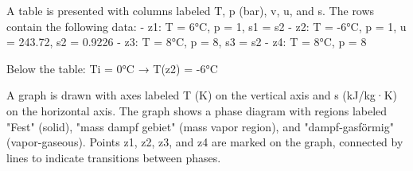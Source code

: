 A table is presented with columns labeled T, p (bar), v, u, and s. The rows contain the following data:  
- z1: T = 6°C, p = 1, s1 = s2  
- z2: T = -6°C, p = 1, u = 243.72, s2 = 0.9226  
- z3: T = 8°C, p = 8, s3 = s2  
- z4: T = 8°C, p = 8  

Below the table:  
Ti = 0°C → T(z2) = -6°C  

A graph is drawn with axes labeled T (K) on the vertical axis and s (kJ/kg·K) on the horizontal axis. The graph shows a phase diagram with regions labeled "Fest" (solid), "mass dampf gebiet" (mass vapor region), and "dampf-gasförmig" (vapor-gaseous). Points z1, z2, z3, and z4 are marked on the graph, connected by lines to indicate transitions between phases.